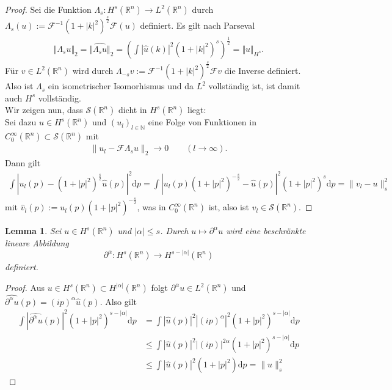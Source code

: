 \documentclass[
paper=a4,
bibtotocnumbered,
liststotocnumbered,
tablecaptionabove,
pointlessnumbers,
twoside,
openright,
10pt
]
{report}
\newtheorem{lem}[thm]{Lemma}
\theoremstyle{definition}
\numberwithin{equation}{chapter}
\begin{document}
\begin{proof}
Sei die Funktion $\Lambda_s : H^s(\mathbb R^n) \rightarrow L^2(\mathbb R^n)$ durch $\Lambda_s(u) := \mathcal{F}^{-1}(1+|k|^2)^{\frac{s}{2}}\mathcal{F}(u)$ definiert. Es gilt nach Parseval
\begin{align*}
\Vert \Lambda_s u \Vert_2 =  \Vert \widehat{\Lambda_s u} \Vert_2 = \left(\int |\widehat{u}(k)|^2(1+|k|^2)^s\right)^{\frac{1}{2}} = \Vert u \Vert_{H^s}.
\end{align*}
Für $v \in L^2(\mathbb R^n)$ wird durch $\Lambda_{-s}v:= \mathcal{F}^{-1}(1+|k|^2)^{\frac{s}{2}}\mathcal{F}v$ die Inverse definiert. Also ist $\Lambda_s$ ein isometrischer Isomorhismus und da $L^2$ vollständig ist, ist damit auch $H^s$ vollständig.
\\ Wir zeigen nun, dass $\mathcal{S}(\mathbb R^n)$ dicht in $H^s(\mathbb R^n)$ liegt:
\\Sei dazu $u \in H^s(\mathbb{R}^n)$ und $(u_l)_{l \in \mathbb{N}} $ eine Folge von Funktionen in $C_0^{\infty}(\mathbb{R}^n)\subset \mathcal{S}(\mathbb{R}^n)$ mit 
\begin{align*}
\| u_l - \mathcal{F}\Lambda_s u\|_2 \to 0 \qquad (l \to \infty).
\end{align*}
Dann gilt
\begin{align*}
\int |u_l(p) - (1+|p|^2)^{\frac{s}{2}}\widehat{u}(p)|^2 \mathrm{d}p = \int |u_l(p)(1+|p|^2)^{-\frac{s}{2} }-\widehat{u}(p)|^2 (1+|p|^2)^s \mathrm{d}p = \|v_l - u\|_s^2
\end{align*}
mit $\widehat{v}_l(p):= u_l(p)(1+|p|^2)^{-\frac{s}{2}}$, was in $C_0^{\infty}(\mathbb{R}^n)$ ist, also ist $v_l \in \mathcal{S}(\mathbb R^n)$.
\end{proof}
\begin{lem}
Sei $u\in H^s(\mathbb R^n)$ und $|\alpha|\le s$. Durch $u\mapsto \partial^\alpha u$ wird eine beschränkte lineare Abbildung
\begin{equation}
\partial^\alpha : H^s(\mathbb R^n) \to H^{s-|\alpha|} (\mathbb R^n)
\end{equation}
definiert.
\end{lem}
\begin{proof}
Aus $u\in H^s(\mathbb R^n) \subset H^{|\alpha|} (\mathbb R^n)$ folgt $\partial^\alpha u \in L^2 (\mathbb{R}^n)$ und $\widehat{\partial^\alpha u}(p) = (ip)^\alpha \widehat{u}(p).$ Also gilt
\begin{align*}
\int | \widehat{\partial^\alpha u}(p)|^2 (1+|p|^2)^{s-|\alpha|} \mathrm{d}p &= \int |\widehat{u}(p)|^2 |(ip)^\alpha|^{2} (1+|p|^2)^{s - |\alpha|} \mathrm{d}p
\\& \leq \int |\widehat{u}(p)|^2 |(ip)|^{2\alpha} (1+|p|^2)^{s - |\alpha|} \mathrm{d}p
\\ & \leq \int |\widehat{u}(p)|^2 (1+|p|^2) \mathrm{d}p = \|u\|_s^2
\end{align*}
\end{proof}
\end{document}
